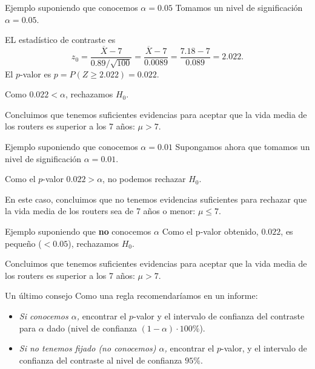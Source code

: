 \documentclass[
  ignorenonframetext,
]{beamer}
\begin{document}
\begin{frame}{Ejemplo suponiendo que conocemos \(\alpha=0.05\)}
\protect\hypertarget{ejemplo-suponiendo-que-conocemos-alpha0.05}{}
Tomamos un nivel de significación \(\alpha=0.05\).

EL estadístico de contraste es \[
z_0=\frac{\overline{X}-7}{0.89/\sqrt{100}}=\frac{\overline{X}-7}{0.0089}=\frac{7.18-7}{0.089}=2.022.
\] El \(p\)-valor es \(p=P(Z\geq 2.022)=0.022.\)

Como \(0.022<\alpha\), rechazamos \(H_0\).

Concluimos que tenemos suficientes evidencias para aceptar que la vida
media de los routers es superior a los 7 años: \(\mu>7\).
\end{frame}

\begin{frame}{Ejemplo suponiendo que conocemos \(\alpha=0.01\)}
\protect\hypertarget{ejemplo-suponiendo-que-conocemos-alpha0.01}{}
Supongamos ahora que tomamos un nivel de significación \(\alpha=0.01\).

Como el \(p\)-valor \(0.022>\alpha\), no podemos rechazar \(H_0\).

En este caso, concluimos que no tenemos evidencias suficientes para
rechazar que la vida media de los routers sea de 7 años o menor:
\(\mu\leq 7\).
\end{frame}

\begin{frame}{Ejemplo suponiendo que \textbf{no} conocemos \(\alpha\)}
\protect\hypertarget{ejemplo-suponiendo-que-no-conocemos-alpha}{}
Como el p-valor obtenido, \(0.022\), es pequeño (\(<0.05\)), rechazamos
\(H_0\).

Concluimos que tenemos suficientes evidencias para aceptar que la vida
media de los routers es superior a los 7 años: \(\mu>7\).
\end{frame}

\begin{frame}{Un último consejo}
\protect\hypertarget{un-uxfaltimo-consejo}{}
Como una regla recomendaríamos en un informe:

\begin{itemize}[<+->]
\item
  \emph{Si conocemos \(\alpha\),} encontrar el \(p\)-valor y el
  intervalo de confianza del contraste para \(\alpha\) dado (nivel de
  confianza \((1-\alpha)\cdot 100\%\)).
\item
  \emph{Si no tenemos fijado (no conocemos) \(\alpha\),} encontrar el
  \(p\)-valor, y el intervalo de confianza del contraste al nivel de
  confianza \(95\%\).
\end{itemize}
\end{frame}
\end{document}
